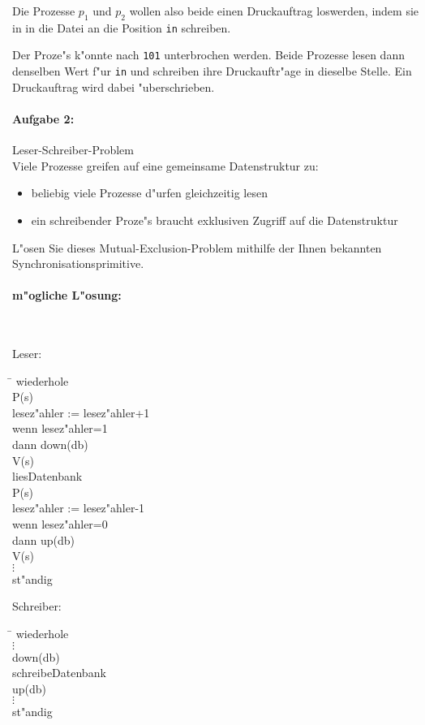\documentclass[titlepage,12pt, bibtotoc, liststotoc]{scrreprt}
\begin{document}
Die Prozesse $p_1$ und $p_2$ wollen also beide einen Druckauftrag 
loswerden, indem sie in in die Datei an die Position \texttt{in} schreiben.

Der Proze"s k"onnte nach \texttt{101} unterbrochen werden. Beide Prozesse lesen
dann denselben Wert f"ur \texttt{in} und schreiben ihre Druckauftr"age in dieselbe
Stelle. Ein Druckauftrag wird dabei "uberschrieben.

\newpage\paragraph{Aufgabe 2:} Leser-Schreiber-Problem \\
Viele Prozesse greifen auf eine gemeinsame Datenstruktur zu:
\begin{itemize}
\item	beliebig viele Prozesse d"urfen gleichzeitig lesen
\item	ein schreibender Proze"s braucht exklusiven Zugriff auf die Datenstruktur
\end{itemize}

L"osen Sie dieses Mutual-Exclusion-Problem mithilfe der Ihnen bekannten 
Synchronisationsprimitive. 
\paragraph{m"ogliche L"osung:}
\ \\

\begin{minipage}[t]{6cm}
Leser:
\ttfamily
\begin{tabbing}
\hspace*{5mm}\=\kill
wiederhole\\
\>	P(s)\\
\>	lesez"ahler := lesez"ahler+1\\
\>	wenn lesez"ahler=1\\
\>	dann down(db)\\
\>	V(s)\\
\>	liesDatenbank\\
\>	P(s)\\
\>	lesez"ahler := lesez"ahler-1\\
\>	wenn lesez"ahler=0\\
\>	dann up(db)\\
\>	V(s)\\
\>	$\vdots$\\
st"andig
\end{tabbing}
\end{minipage}
\begin{minipage}[t]{6cm}
Schreiber:
\ttfamily
\begin{tabbing}
\hspace*{5mm}\=\kill
wiederhole\\
\>	$\vdots$\\
\>	down(db)\\
\>	schreibeDatenbank\\
\>	up(db)\\
\>	$\vdots$\\
st"andig
\end{tabbing}
\end{minipage}
\end{document}
